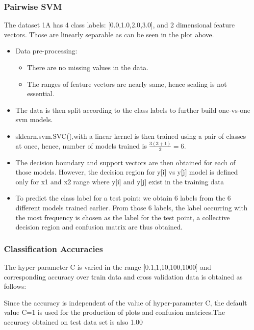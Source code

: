 \documentclass[11pt,a4paper]{article}
\newcommand{\noi}{\noindent}
\begin{document}
\subsubsection{Pairwise SVM}
The dataset 1A has 4 class labels: [0.0,1.0,2.0,3.0], and 2 dimensional feature vectors. Those are linearly separable as can be seen in the plot above.
\begin{itemize}
    \item Data pre-processing:
    \begin{itemize}
        \item There are no missing values in the data.
        \item The ranges of feature vectors are nearly same, hence scaling is not essential. 
    \end{itemize}
    \item The data is then split according to the class labels to further build one-vs-one svm models.
    \item sklearn.svm.SVC(),with a linear kernel is then trained using a pair of classes at once, hence, number of models trained is $\frac{3(3+1)}{2}=6$. 
    \item The decision boundary and support vectors are then obtained for each of those models. However, the decision region for y[i] vs y[j] model is defined only for x1 and x2 range where y[i] and y[j] exist in the training data
    \item To predict the class label for a test point: we obtain 6 labels from the 6 different models trained earlier. From those 6 labels, the label occurring with the most frequency is chosen as the label for the test point, a collective decision region and confusion matrix are thus obtained.
\end{itemize}

\subsubsection{Classification Accuracies}
The hyper-parameter C is varied in the range [0.1,1,10,100,1000] and corresponding accuracy over train data and cross validation data is obtained as follows: 


\noi
Since the accuracy is independent of the value of hyper-parameter C, the default value C=1 is used for the production of plots and confusion matrices.The accuracy obtained on test data set is also 1.00 
\end{document}
